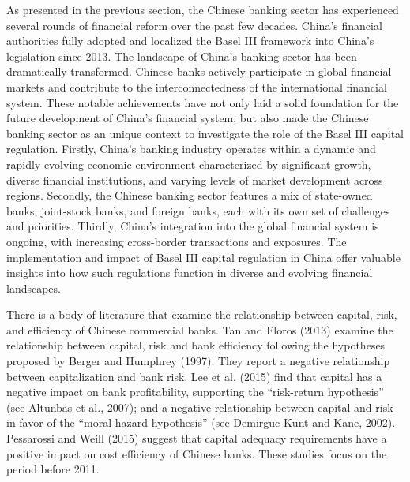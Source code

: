 \documentclass[
  12pt,
  a4paper,
]{scrreprt}
\begin{document}
{{{{As presented in the previous section, the Chinese banking sector has
experienced several rounds of financial reform over the past few
decades. China's financial authorities fully adopted and localized the
Basel III framework into China's legislation since 2013. The landscape
of China's banking sector has been dramatically transformed. Chinese
banks actively participate in global financial markets and contribute to
the interconnectedness of the international financial system. These
notable achievements have not only laid a solid foundation for the
future development of China's financial system; but also made the
Chinese banking sector as an unique context to investigate the role of
the Basel III capital regulation. Firstly, China's banking industry
operates within a dynamic and rapidly evolving economic environment
characterized by significant growth, diverse financial institutions, and
varying levels of market development across regions. Secondly, the
Chinese banking sector features a mix of state-owned banks, joint-stock
banks, and foreign banks, each with its own set of challenges and
priorities. Thirdly, China's integration into the global financial
system is ongoing, with increasing cross-border transactions and
exposures. The implementation and impact of Basel III capital regulation
in China offer valuable insights into how such regulations function in
diverse and evolving financial landscapes.

There is a body of literature that examine the relationship between
capital, risk, and efficiency of Chinese commercial banks. Tan and
Floros (2013) examine the relationship between capital, risk and bank
efficiency following the hypotheses proposed by Berger and Humphrey
(1997). They report a negative relationship between capitalization and
bank risk. Lee et al. (2015) find that capital has a negative impact on
bank profitability, supporting the ``risk-return hypothesis'' (see
Altunbas et al., 2007); and a negative relationship between capital and
risk in favor of the ``moral hazard hypothesis'' (see Demirguc-Kunt and
Kane, 2002). Pessarossi and Weill (2015) suggest that capital adequacy
requirements have a positive impact on cost efficiency of Chinese banks.
These studies focus on the period before 2011.

}}}}
\end{document}
